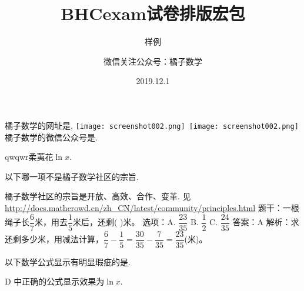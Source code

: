 \documentclass[answers]{BHCexam}
\begin{document}
	
\title{BHCexam试卷排版宏包}
\subtitle{样例}
\author{微信关注公众号：橘子数学}
\date{2019.12.1}
\maketitle
	
\begin{groups}
		
\begin{questions}[]
			
\question[30] 橘子数学的网址是, \quad\texttt{[image: screenshot002.png]}\quad\
\texttt{[image: screenshot002.png]}橘子数学的微信公众号是.
\begin{solution}{4cm}
	\methodonly qwqwr柔荑花$\ln{x}$.
\end{solution}
\end{questions}
		
\begin{questions}[p]
			
\question[30] 以下哪一项不是橘子数学社区的宗旨.
			
\begin{solution}{4cm}
	\method 橘子数学社区的宗旨是开放、高效、合作、变革.
	\method 见 \url{http://docs.mathcrowd.cn/zh_CN/latest/community/principles.html}
	\method 题干：一根绳子长\( \dfrac{6}{7}\)米，用去\( \dfrac{1}{5}\)米后，还剩(   )米。
	选项：A. \( \dfrac{23}{35}\)            B. \( \dfrac{1}{2}\)            C. \( \dfrac{24}{35}\)
	答案：A
	解析：求还剩多少米，用减法计算，\( \dfrac{6}{7}-\dfrac{1}{5}=\dfrac{30}{35}-\dfrac{7}{35}=\dfrac{23}{35}\)(米)。\\
\end{solution}
			
\question[40] 以下数学公式显示有明显瑕疵的是\key{D}.
	\fivechoices{$\sin A$}{$2+3\mathrm{i}$}{$x^2$}{$\ln x$}{$\mathrm{e}^{\mathrm{i}\theta}$}
			
\begin{solution}{4cm}
\methodonly D 中正确的公式显示效果为$\ln{x}$.
\end{solution}
\end{questions}
		

\end{groups}
\end{document}
